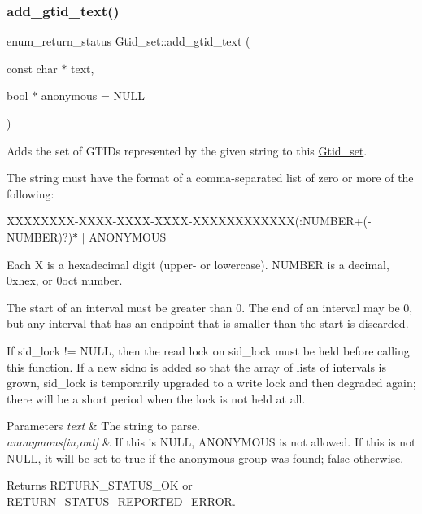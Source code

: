 \subsubsection{\texorpdfstring{add\+\_\+gtid\+\_\+text()}{add\_gtid\_text()}}
{\footnotesize\ttfamily enum\+\_\+return\+\_\+status Gtid\+\_\+set\+::add\+\_\+gtid\+\_\+text (\begin{DoxyParamCaption}\item[{const char $\ast$}]{text,  }\item[{bool $\ast$}]{anonymous = {\ttfamily NULL} }\end{DoxyParamCaption})}

Adds the set of G\+T\+I\+Ds represented by the given string to this \mbox{\hyperlink{classGtid__set}{Gtid\+\_\+set}}.

The string must have the format of a comma-\/separated list of zero or more of the following\+:

X\+X\+X\+X\+X\+X\+XX-\/X\+X\+XX-\/X\+X\+XX-\/X\+X\+XX-\/X\+X\+X\+X\+X\+X\+X\+X\+X\+X\+XX(\+:N\+U\+M\+B\+ER+(-\/N\+U\+M\+B\+ER)?)$\ast$ $\vert$ A\+N\+O\+N\+Y\+M\+O\+US

Each X is a hexadecimal digit (upper-\/ or lowercase). N\+U\+M\+B\+ER is a decimal, 0xhex, or 0oct number.

The start of an interval must be greater than 0. The end of an interval may be 0, but any interval that has an endpoint that is smaller than the start is discarded.

If sid\+\_\+lock != N\+U\+LL, then the read lock on sid\+\_\+lock must be held before calling this function. If a new sidno is added so that the array of lists of intervals is grown, sid\+\_\+lock is temporarily upgraded to a write lock and then degraded again; there will be a short period when the lock is not held at all.


\begin{DoxyParams}{Parameters}
{\em text} & The string to parse. \\
\hline
{\em anonymous\mbox{[}in,out\mbox{]}} & If this is N\+U\+LL, A\+N\+O\+N\+Y\+M\+O\+US is not allowed. If this is not N\+U\+LL, it will be set to true if the anonymous group was found; false otherwise. \\
\hline
\end{DoxyParams}
\begin{DoxyReturn}{Returns}
R\+E\+T\+U\+R\+N\+\_\+\+S\+T\+A\+T\+U\+S\+\_\+\+OK or R\+E\+T\+U\+R\+N\+\_\+\+S\+T\+A\+T\+U\+S\+\_\+\+R\+E\+P\+O\+R\+T\+E\+D\+\_\+\+E\+R\+R\+OR. 
\end{DoxyReturn}
\mbox{\label{classGtid__set_a11541c02363dc7a2877a5a0282d679ab}} 
